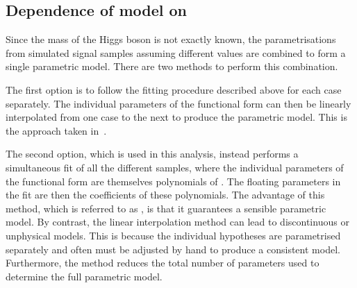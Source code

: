 \fi

\subsection{Dependence of model on \mH}

Since the mass of the Higgs boson is not exactly known, the parametrisations from simulated signal samples assuming different \mH values are combined to form a single parametric model. There are two methods to perform this combination. 

The first option is to follow the fitting procedure described above for each \mH case separately. The individual parameters of the functional form can then be linearly interpolated from one \mH case to the next to produce the parametric model. This is the approach taken in~\cite{LegacyHgg,CMS-PAS-HIG-15-005,CMS-PAS-HIG-16-020}.

The second option, which is used in this analysis, instead performs a simultaneous fit of all the different \mH samples, where the individual parameters of the functional form are themselves polynomials of \mH. %
The floating parameters in the fit are then the coefficients of these polynomials. %
The advantage of this method, which is referred to as \SSF, is that it guarantees a sensible parametric model. By contrast, the linear interpolation method can lead to discontinuous or unphysical models. This is because the individual \mH hypotheses are parametrised separately and often must be adjusted by hand to produce a consistent model. 
Furthermore, the \SSF method reduces the total number of parameters used to determine the full parametric model.

